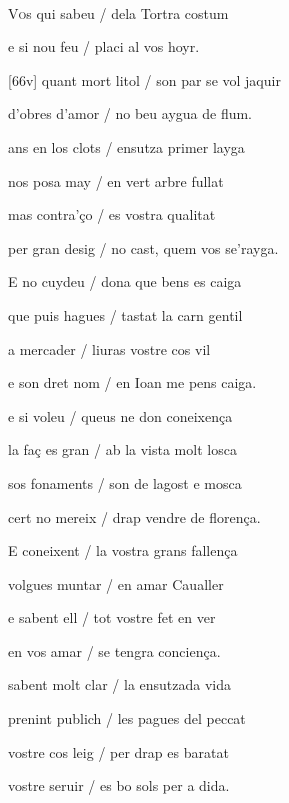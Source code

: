 \documentclass[12pt]{article}
\renewcommand{\espaiAbansEtiquetaPoema}{\vspace{0ex}}
\begin{document}
\begin{estrofa}

\espaiAbansEtiquetaPoema

\\

\end{estrofa}


\begin{estrofa}

 V\textsc{o}s qui sabeu / dela Tortra costum

 e si nou feu / placi al vos hoyr.

 [66v] quant mort litol / son par se vol jaquir

 d'obres d'amor / no beu aygua de flum.

 ans en los clots / ensutza primer layga

 nos posa may / en vert arbre fullat

 mas contra'\c{c}o / es vostra qualitat

 per gran desig / no cast, quem vos se'rayga.

\end{estrofa}



\begin{estrofa}

 E no cuydeu / dona que bens es caiga

 que puis hagues / tastat la carn gentil

 a mercader / liuras vostre cos vil

 e son dret nom / en Ioan me pens caiga.

 e si voleu / queus ne don coneixen\c{c}a

 la fa\c{c} es gran / ab la vista molt losca

 sos fonaments / son de lagost e mosca

 cert no mereix / drap vendre de floren\c{c}a.

\end{estrofa}



\begin{estrofa}

 E coneixent / la vostra grans fallen\c{c}a

 volgues muntar / en amar Caualler

 e sabent ell / tot vostre fet en ver

 en vos amar / se tengra concien\c{c}a.

 sabent molt clar / la ensutzada vida

 prenint publich / les pagues del peccat

 vostre cos leig / per drap es baratat

 vostre seruir / es bo sols per a dida.

\end{estrofa}
\end{document}
